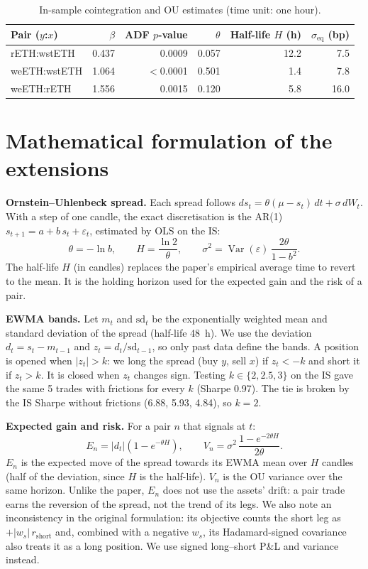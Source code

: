 \documentclass[10pt,a4paper]{article}
\begin{document}
\begin{table}[h]
\centering\small
\caption{In-sample cointegration and OU estimates (time unit: one hour).}
\label{tab:coint}
\begin{tabular}{lrrrrr}
\toprule
Pair ($y$:$x$) & $\beta$ & ADF $p$-value & $\theta$ & Half-life $H$ (h) & $\sigma_{\text{eq}}$ (bp)\\
\midrule
rETH:wstETH  & 0.437 & 0.0009 & 0.057 & 12.2 & 7.5\\
weETH:wstETH & 1.064 & $<$0.0001 & 0.501 & 1.4 & 7.8\\
weETH:rETH   & 1.556 & 0.0015 & 0.120 & 5.8 & 16.0\\
\bottomrule
\end{tabular}
\end{table}

\section{Mathematical formulation of the extensions}

\textbf{Ornstein--Uhlenbeck spread.} Each spread follows
$ds_t=\theta(\mu-s_t)\,dt+\sigma\,dW_t$. With a step of one candle, the exact
discretisation is the AR(1) $s_{t+1}=a+b\,s_t+\varepsilon_t$, estimated by OLS on the IS:
\[
\theta=-\ln b,\qquad H=\frac{\ln 2}{\theta},\qquad
\sigma^2=\operatorname{Var}(\varepsilon)\,\frac{2\theta}{1-b^2}.
\]
The half-life $H$ (in candles) replaces the paper's empirical average time to revert to
the mean. It is the holding horizon used for the expected gain and the risk of a pair.

\textbf{EWMA bands.} Let $m_t$ and $\mathrm{sd}_t$ be the exponentially weighted mean and
standard deviation of the spread (half-life 48~h). We use the deviation
$d_t=s_t-m_{t-1}$ and $z_t=d_t/\mathrm{sd}_{t-1}$, so only past data define the bands. A
position is opened when $|z_t|>k$: we long the spread (buy $y$, sell $x$) if $z_t<-k$ and
short it if $z_t>k$. It is closed when $z_t$ changes sign. Testing $k\in\{2,2.5,3\}$ on
the IS gave the same 5 trades with frictions for every $k$ (Sharpe 0.97). The tie is
broken by the IS Sharpe without frictions (6.88, 5.93, 4.84), so $k=2$.

\textbf{Expected gain and risk.} For a pair $n$ that signals at $t$:
\[
E_n=|d_t|\left(1-e^{-\theta H}\right),\qquad
V_n=\sigma^2\,\frac{1-e^{-2\theta H}}{2\theta}.
\]
$E_n$ is the expected move of the spread towards its EWMA mean over $H$ candles (half of
the deviation, since $H$ is the half-life). $V_n$ is the OU variance over the same
horizon. Unlike the paper, $E_n$ does not use the assets' drift: a pair trade earns the
reversion of the spread, not the trend of its legs. We also note an inconsistency in
the original formulation: its objective counts the short leg as $+|w_s|\,r_{\text{short}}$
and, combined with a negative $w_s$, its Hadamard-signed covariance also treats it as a
long position. We use signed long--short P\&L and variance instead.
\end{document}

